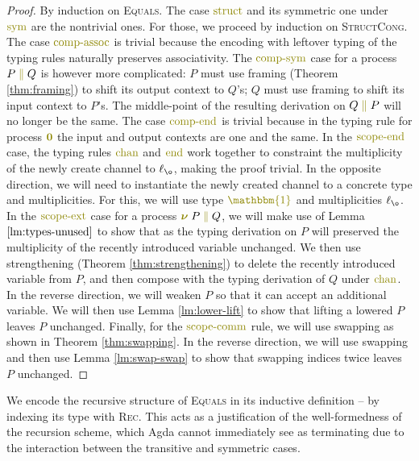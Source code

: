 \documentclass[a4paper,UKenglish,cleveref, autoref, thm-restate,authorcolumns]{lipics-v2019}
\theoremstyle{definition}
\newcommand{\constr}[1]{\textcolor{olive}{\operatorname{#1}}}
\newcommand{\PO}{\constr{\mathbf{0}}}
\newcommand{\comp}[2]{#1 \; \constr{\parallel} \; #2}
\newcommand{\new}{\constr{\boldsymbol{\nu}} \;}
\newcommand{\unit}{\constr{\mathbbm{1}}}
\begin{document}
\begin{proof}
  By induction on \textsc{Equals}.
  The case $\constr{struct}$ and its symmetric one under $\constr{sym}$ are the nontrivial ones.
  For those, we proceed by induction on \textsc{StructCong}.
  The case $\constr{comp-assoc}$ is trivial because the encoding with leftover typing of the typing rules naturally preserves associativity.
  The $\constr{comp-sym}$ case for a process $\comp{P}{Q}$ is however more complicated: $P$ must use framing (Theorem \ref{thm:framing}) to shift its output context to $Q$'s; $Q$ must use framing to shift its input context to $P$'s.
  The middle-point of the resulting derivation on $\comp{Q}{P}$ will no longer be the same.
  The case $\constr{comp-end}$ is trivial because in the typing rule for process $\PO$ the input and output contexts are one and the same.
  In the $\constr{scope-end}$ case, the typing rules $\constr{chan}$ and $\constr{end}$ work together to constraint the multiplicity of the newly create channel to $\ell_{\o}$, making the proof trivial.
  In the opposite direction, we will need to instantiate the newly created channel to a concrete type and multiplicities.
  For this, we will use type $\unit$ and multiplicities $\ell_{\o}$.
  In the $\constr{scope-ext}$ case for a process $\new \comp{P}{Q}$, we will make use of Lemma $\ref{lm:types-unused}$ to show that as the typing derivation on $P$ will preserved the multiplicity of the recently introduced variable unchanged.
  We then use strengthening (Theorem \ref{thm:strengthening}) to delete the recently introduced variable from $P$, and then compose with the typing derivation of $Q$ under $\constr{chan}$.
  In the reverse direction, we will weaken $P$ so that it can accept an additional variable.
  We will then use Lemma \ref{lm:lower-lift} to show that lifting a lowered $P$ leaves $P$ unchanged.
  Finally, for the $\constr{scope-comm}$ rule, we will use swapping as shown in Theorem \ref{thm:swapping}.
  In the reverse direction, we will use swapping and then use Lemma \ref{lm:swap-swap} to show that swapping indices twice leaves $P$ unchanged.
\end{proof}

\begin{remark}
  We encode the recursive structure of \textsc{Equals} in its inductive definition -- by indexing its type with \textsc{Rec}.
  This acts as a justification of the well-formedness of the recursion scheme, which Agda cannot immediately see as terminating due to the interaction between the transitive and symmetric cases.
\end{remark}
\end{document}
